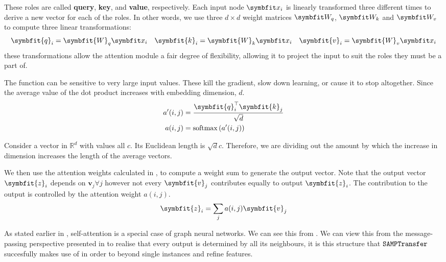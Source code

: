 These roles are called \textbf{query}, \textbf{key}, and \textbf{value}, respectively. Each input node $\bfitx_i$ is linearly transformed three different times to derive a new vector for each of the roles. In other words, we use three $d\times d$ weight matrices $\Wq$, $\Wk$ and $\Wv$ to compute three linear transformations:
\begin{equation}
    \symbfit{q}_{i}=\symbfit{W}_{q} \bfitx_{i} \quad \symbfit{k}_{i}=\symbfit{W}_{k} \bfitx_{i} \quad \symbfit{v}_{i}=\symbfit{W}_{v} \bfitx_{i}
\end{equation}
these transformations allow the attention module a fair degree of flexibility, allowing it to project the input to suit the roles they must be a part of. 

The  function can be sensitive to very large input values. These kill the gradient, slow down learning, or cause it to stop altogether. Since the average value of the dot product increases with embedding dimension, $d$.
\begin{equation}
\label{eqn:qkv-attn-weight-calc}
\begin{split}
    a^\prime(i, j) &= \frac{\symbfit{q}_i^\top \symbfit{k}_j}{\sqrt{d}}\\
    a(i, j) &= \operatorname{softmax}\left( a^\prime(i, j) \right)\\
\end{split}
\end{equation}

\begin{tcolorbox}[title=Why $\sqrt{d}$?]
Consider a vector in $\mathbb{R}^d$ with values all $c$. Its Euclidean length is $\sqrt{d}c$. Therefore, we are dividing out the amount by which the increase in dimension increases the length of the average vectors.
\end{tcolorbox}

We then use the attention weights calculated in , to compute a weight sum to generate the output vector. Note that the output vector $\symbfit{z}_i$ depends on $\symbf{v}_j \forall j$ however not every $\symbfit{v}_j$ contributes equally to output $\symbfit{z}_i$. The contribution to the output is controlled by the attention weight $a(i, j)$.
\begin{equation}
    \label{eqn:qkv-attn-aggregation}
    \symbfit{z}_{i}=\sum_{j} a(i, j) \symbfit{v}_{j}
\end{equation}

As stated earlier in , self-attention is a special case of graph neural networks. We can see this from . We can view this from the message-passing perspective presented in  to realise that every output is determined by all its neighbours, it is this structure that $\texttt{SAMPTransfer}$ succesfully makes use of in order to  beyond single instances and refine features.